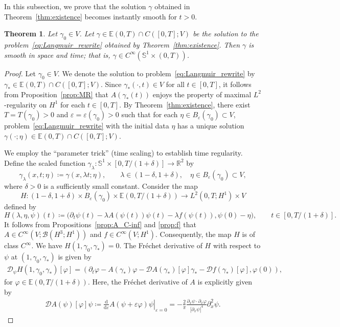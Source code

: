 \documentclass{article}
\newtheorem{theorem}{Theorem}[section]
\theoremstyle{remark}
\theoremstyle{definition}
\numberwithin{equation}{section}
\begin{document}
In this subsection, we prove that the solution $\gamma$ obtained in Theorem~\ref{thm:existence} becomes instantly smooth for $t > 0$.

\begin{theorem}\label{thm:regularity}
    Let $\gamma_0 \in V$. Let $\gamma \in \mathbb{E}(0,T) \cap C([0,T];V)$ be the solution to the problem~\eqref{eq:Langmuir_rewrite} obtained by Theorem~\ref{thm:existence}.
    Then $\gamma$ is smooth in space and time; that is, $\gamma \in C^\infty(\mathbb{S}^1 \times (0, T))$.
\end{theorem}

\begin{proof}
    Let $\gamma_0 \in V$.
    We denote the solution to problem~\eqref{eq:Langmuir_rewrite} by $\gamma_* \in \mathbb{E}(0,T) \cap C([0,T];V)$.
    Since $\gamma_*(\cdot, t) \in V$ for all $t \in [0, T]$, it follows from Proposition~\ref{prop:MR} that $A(\gamma_*(t))$ enjoys the property of maximal $L^2$-regularity on $H^1$ for each $t\in[0,T]$.
    By Theorem~\ref{thm:existence}, there exist $T=T(\gamma_0)>0$ and $\varepsilon=\varepsilon(\gamma_0)>0$ such that for each $\eta \in B_\varepsilon(\gamma_0) \subset V$, problem~\eqref{eq:Langmuir_rewrite} with the initial data $\eta$ has a unique solution $\gamma(\cdot; \eta) \in \mathbb{E}(0,T) \cap C([0,T];V)$.
    
    We employ the ``parameter trick'' (time scaling) to establish time regularity.
    Define the scaled function $\gamma_\lambda : \mathbb{S}^1 \times [0, T/(1+\delta)] \to \mathbb{R}^2$ by 
    \[
        \gamma_\lambda(x,t; \eta) \coloneqq \gamma(x, \lambda t; \eta), \qquad \lambda \in (1-\delta, 1+\delta), \quad \eta \in B_\varepsilon(\gamma_0) \subset V, 
    \]
    where $\delta>0$ is a sufficiently small constant.
    Consider the map 
    \[
        H: (1-\delta, 1+\delta) \times B_\varepsilon(\gamma_0) \times \mathbb{E}(0,T/(1+\delta)) \to L^2(0,T;H^1) \times V
    \]
    defined by
    \[
        H(\lambda, \eta, \psi)(t) \coloneqq \bigl( \partial_t \psi(t) - \lambda A(\psi(t)) \psi(t) - \lambda f(\psi(t)), \psi(0)-\eta \bigr), \qquad t \in [0, T/(1+\delta)].
    \]
    It follows from Propositions~\ref{prop:A_C-inf} and \ref{prop:f} that $A \in C^\infty(V; \mathcal{B}(H^3; H^1))$ and $f \in C^\infty(V; H^1)$.
    Consequently, the map $H$ is of class $C^\infty$. 
    We have $H(1, \gamma_0, \gamma_*)=0$. The Fréchet derivative of $H$ with respect to $\psi$ at $(1, \gamma_0, \gamma_*)$ is given by
    \begin{align*}
        \mathcal{D}_\psi H(1, \gamma_0, \gamma_*) [\varphi] = ( \partial_t \varphi - A(\gamma_*) \varphi - \mathcal{D}A(\gamma_*)[\varphi]\gamma_\ast - \mathcal{D}f(\gamma_*)[\varphi], \varphi(0)),
    \end{align*}
    for $\varphi \in \mathbb{E}(0,T/(1+\delta))$.
    Here, the Fréchet derivative of $A$ is explicitly given by
    \begin{align*}
        \mathcal{D}A(\psi)[\varphi]\psi 
        \coloneqq \left. \frac{\mathrm{d}}{\mathrm{d}\varepsilon} A(\psi + \varepsilon \varphi) \psi \right|_{\varepsilon = 0}
        = -\frac{2}{\pi} \frac{\partial_x \psi \cdot \partial_x \varphi}{|\partial_x \psi|^4}\partial_x^2 \psi.
    \end{align*}


\end{proof}
\end{document}
